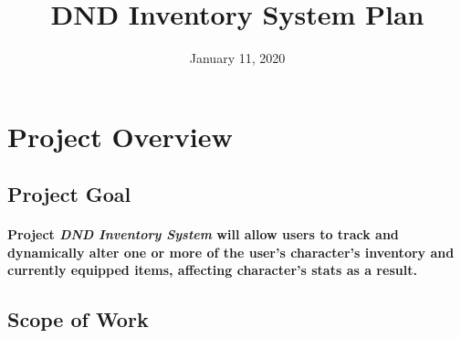 \documentclass[12pt,letterpaper]{article}
\title{DND Inventory System Plan}
\date{January 11, 2020}
\begin{document}
	\begin{titlepage}
		\maketitle
		\begin{center}
		\end{center}
			
		
		\thispagestyle{empty}
		\pagebreak
	\end{titlepage}

	\section{Project Overview}
		\subsection{Project Goal}
			\paragraph{\indent Project \emph{DND Inventory System} will allow users to track and dynamically alter one or more of the user's character's inventory and currently equipped items, affecting character's stats as a result.}
		\subsection{Scope of Work}
\end{document}
